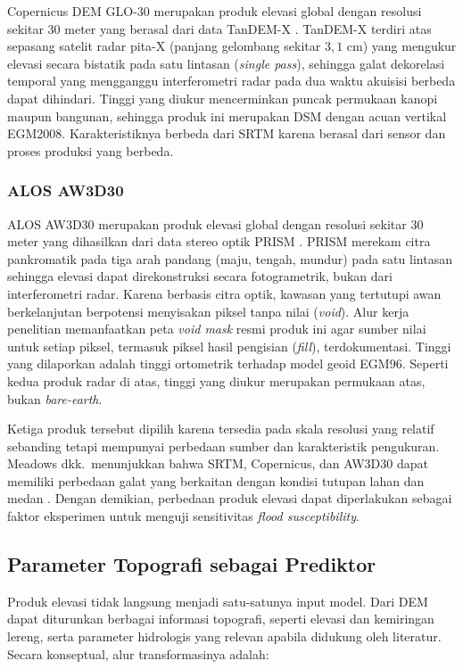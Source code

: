 \documentclass[12pt]{article}
\begin{document}
Copernicus DEM GLO-30 merupakan produk elevasi global dengan resolusi
sekitar 30 meter yang berasal dari data TanDEM-X \cite{esa_glo30}. TanDEM-X
terdiri atas sepasang satelit radar pita-X (panjang gelombang sekitar
$3{,}1$ cm) yang mengukur elevasi secara bistatik pada satu lintasan
(\textit{single pass}), sehingga galat dekorelasi temporal yang
mengganggu interferometri radar pada dua waktu akuisisi berbeda
dapat dihindari. Tinggi yang diukur mencerminkan puncak permukaan kanopi
maupun bangunan, sehingga produk ini merupakan DSM dengan acuan vertikal
EGM2008. Karakteristiknya berbeda dari SRTM karena berasal dari sensor dan
proses produksi yang berbeda.

\subsubsection{ALOS AW3D30}

ALOS AW3D30 merupakan produk elevasi global dengan resolusi sekitar 30 meter
yang dihasilkan dari data stereo optik PRISM \cite{tadono2016}. PRISM
merekam citra pankromatik pada tiga arah pandang (maju, tengah, mundur) pada
satu lintasan sehingga elevasi dapat direkonstruksi secara fotogrametrik,
bukan dari interferometri radar. Karena berbasis citra optik, kawasan yang
tertutupi awan berkelanjutan berpotensi menyisakan piksel tanpa nilai
(\textit{void}). Alur kerja penelitian memanfaatkan peta \textit{void mask}
resmi produk ini agar sumber nilai untuk setiap piksel, termasuk piksel
hasil pengisian (\textit{fill}), terdokumentasi. Tinggi yang dilaporkan
adalah tinggi ortometrik terhadap model geoid EGM96. Seperti kedua produk radar
di atas, tinggi yang diukur merupakan permukaan atas, bukan
\textit{bare-earth}.

Ketiga produk tersebut dipilih karena tersedia pada skala resolusi yang
relatif sebanding tetapi mempunyai perbedaan sumber dan karakteristik
pengukuran. Meadows dkk.\ menunjukkan bahwa SRTM, Copernicus, dan AW3D30
dapat memiliki perbedaan galat yang berkaitan dengan kondisi tutupan lahan
dan medan \cite{meadows2024}. Dengan demikian, perbedaan produk elevasi dapat
diperlakukan sebagai faktor eksperimen untuk menguji sensitivitas
\textit{flood susceptibility}.

\subsection{Parameter Topografi sebagai Prediktor}

Produk elevasi tidak langsung menjadi satu-satunya input model. Dari DEM
dapat diturunkan berbagai informasi topografi, seperti elevasi dan kemiringan
lereng, serta parameter hidrologis yang relevan apabila didukung oleh
literatur. Secara konseptual, alur transformasinya adalah:
\end{document}

